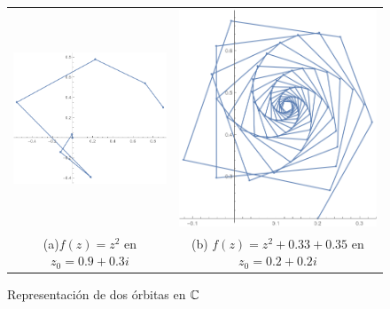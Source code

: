 \begin{figure}[ht]
    \centering
    \begin{tabular}{cc}
      \includegraphics[scale=0.45]{./img/C2/orbita-1.png} &   \includegraphics[scale=0.4]{./img/C2/orbita-2.png} \\
    (a)$f(z)=z^2$ en $z_0=0.9+0.3i$ & (b) $f(z)=z^2+0.33+0.35$ en $z_0=0.2+0.2i$ \\[6pt]
    \end{tabular}
    \caption{Representación de dos órbitas en $\mathbb{C}$}
    \label{fig:orbitas-C}
\end{figure}

